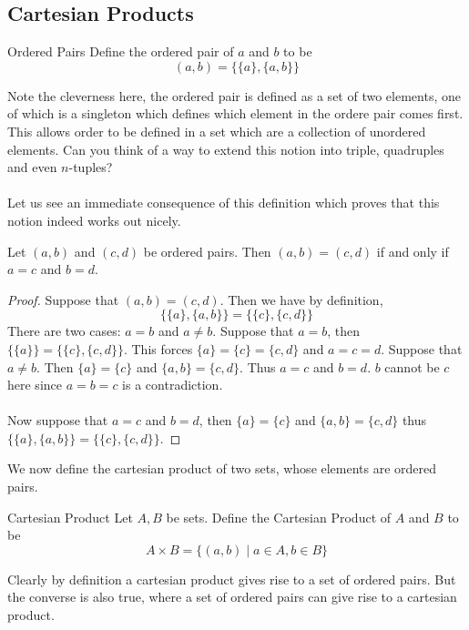 \documentclass[a4paper]{article}
\begin{document}
\subsection{Cartesian Products}
\begin{defn}{Ordered Pairs}{} Define the ordered pair of $a$ and $b$ to be $$(a,b)=\{\{a\},\{a,b\}\}$$
\end{defn}

Note the cleverness here, the ordered pair is defined as a set of two elements, one of which is a singleton which defines which element in the ordere pair comes first. This allows order to be defined in a set which are a collection of unordered elements. Can you think of a way to extend this notion into triple, quadruples and even $n$-tuples?\\~\\

Let us see an immediate consequence of this definition which proves that this notion indeed works out nicely. 

\begin{prp}{}{} Let $(a,b)$ and $(c,d)$ be ordered pairs. Then $(a,b)=(c,d)$ if and only if $a=c$ and $b=d$. \tcbline
\begin{proof} Suppose that $(a,b)=(c,d)$. Then we have by definition, $$\{\{a\},\{a,b\}\}=\{\{c\},\{c,d\}\}$$ There are two cases: $a=b$ and $a\neq b$. Suppose that $a=b$, then $\{\{a\}\}=\{\{c\},\{c,d\}\}$. This forces $\{a\}=\{c\}=\{c,d\}$ and $a=c=d$. Suppose that $a\neq b$. Then $\{a\}=\{c\}$ and $\{a,b\}=\{c,d\}$. Thus $a=c$ and $b=d$. $b$ cannot be $c$ here since $a=b=c$ is a contradiction. \\~\\

Now suppose that $a=c$ and $b=d$, then $\{a\}=\{c\}$ and $\{a,b\}=\{c,d\}$ thus $\{\{a\},\{a,b\}\}=\{\{c\},\{c,d\}\}$. 
\end{proof}
\end{prp}

We now define the cartesian product of two sets, whose elements are ordered pairs. 

\begin{defn}{Cartesian Product}{} Let $A,B$ be sets. Define the Cartesian Product of $A$ and $B$ to be $$A\times B=\{(a,b)\;|\;a\in A, b\in B\}$$
\end{defn}

Clearly by definition a cartesian product gives rise to a set of ordered pairs. But the converse is also true, where a set of ordered pairs can give rise to a cartesian product. 
\end{document}
